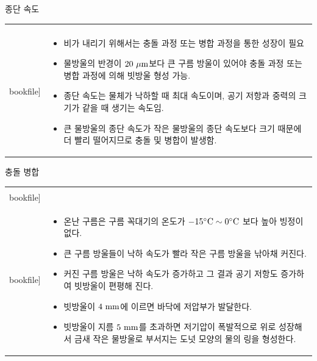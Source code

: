 \begin{frame}[t]{종단 속도}
	\begin{tabular}{ll}
		\begin{minipage}[t]{0.45\textwidth} \scriptsize
			\begin{figure}[t]
				\texttt{[image: \\bookfile]}
			\end{figure}
		\end{minipage}	
		&
		\begin{minipage}[t]{0.5\textwidth} \scriptsize
			\begin{itemize}
				\item 비가 내리기 위해서는 충돌 과정 또는 병합 과정을 통한 성장이 필요
				\item 물방울의 반경이 $20 \rm{~\mu m}$보다 큰 구름 방울이 있어야 충돌 과정 또는 병합 과정에 의해 빗방울 형성 가능.
				\item 종단 속도는 물체가 낙하할 때 최대 속도이며, 공기 저항과 중력의 크기가 같을 때 생기는 속도임. 
				\item 큰 물방울의 종단 속도가 작은 물방울의 종단 속도보다 크기 때문에 더 빨리 떨어지므로 충돌 및 병합이 발생함. 
			\end{itemize}		

		\end{minipage}
	\end{tabular}
\end{frame}






\begin{frame}[t]{충돌 병합}
	\begin{tabular}{ll}
		\begin{minipage}[t]{0.60\textwidth}\scriptsize
			\begin{figure}[t]
				\texttt{[image: \\bookfile]} 		\texttt{[image: \\bookfile]}
			\end{figure}
		\end{minipage}	
		&
		\begin{minipage}[t]{0.35\textwidth} \scriptsize
			\begin{itemize}
				\item 온난 구름은 구름 꼭대기의 온도가 $-15 \rm{{^\circ}C} \sim 0 \rm{{^\circ}C}$ 보다 높아 빙정이 없다.
				\item 큰 구름 방울들이 낙하 속도가 빨라 작은 구름 방울을 낚아채 커진다.
				\item 커진 구름 방울은 낙하 속도가 증가하고 그 결과 공기 저항도 증가하여 빗방울이 편평해 진다.				
				\item 빗방울이 $4 \rm{~mm} $에 이르면 바닥에 저압부가 발달한다.
				\item 빗방울이 지름 $5 \rm{~mm} $를 초과하면 저기압이 폭발적으로 위로 성장해서 금새 작은 물방울로 부서지는 도넛 모양의 물의 링을 형성한다. 
				
			\end{itemize}		
			
		\end{minipage}
	\end{tabular}
\end{frame}


